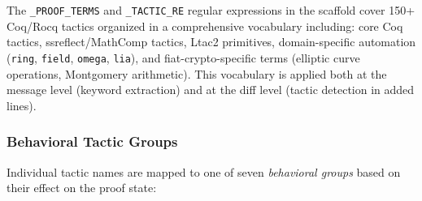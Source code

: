 \documentclass[11pt]{article}
\begin{document}
The \texttt{\_PROOF\_TERMS} and \texttt{\_TACTIC\_RE} regular expressions in the scaffold cover 150+ Coq/Rocq tactics organized in a comprehensive vocabulary including: core Coq tactics, ssreflect/MathComp tactics, Ltac2 primitives, domain-specific automation (\texttt{ring}, \texttt{field}, \texttt{omega}, \texttt{lia}), and fiat-crypto-specific terms (elliptic curve operations, Montgomery arithmetic). This vocabulary is applied both at the message level (keyword extraction) and at the diff level (tactic detection in added lines).

\subsubsection{Behavioral Tactic Groups}

Individual tactic names are mapped to one of seven \textit{behavioral groups} based on their effect on the proof state:
\end{document}
